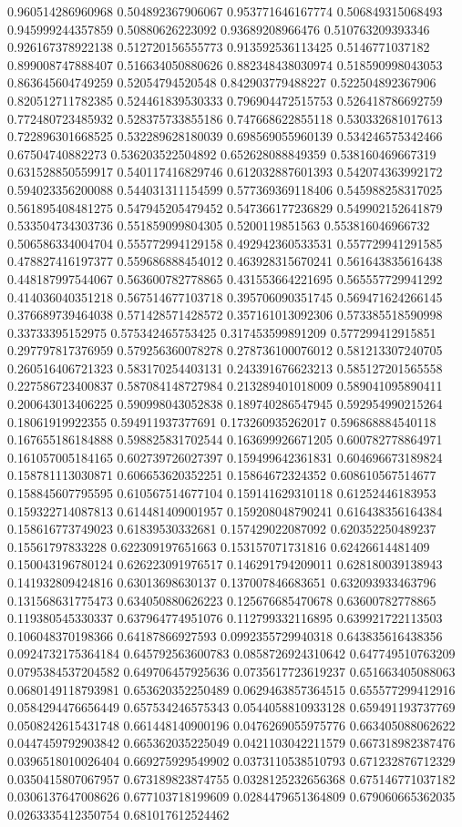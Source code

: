 \begin{table}
\begin{tabu}
\begin{sparkline}{10}
0.960514286960968 0.504892367906067 0.953771646167774 0.506849315068493 0.945999244357859 0.50880626223092 0.93689208966476 0.510763209393346 0.926167378922138 0.512720156555773 0.913592536113425 0.5146771037182 0.899008747888407 0.516634050880626 0.882348438030974 0.518590998043053 0.863645604749259 0.52054794520548 0.842903779488227 0.522504892367906 0.820512711782385 0.524461839530333 0.796904472515753 0.526418786692759 0.772480723485932 0.528375733855186 0.747668622855118 0.530332681017613 0.722896301668525 0.532289628180039 0.698569055960139 0.534246575342466 0.67504740882273 0.536203522504892 0.652628088849359 0.538160469667319 0.631528850559917 0.540117416829746 0.612032887601393 0.542074363992172 0.594023356200088 0.544031311154599 0.577369369118406 0.545988258317025 0.561895408481275 0.547945205479452 0.547366177236829 0.549902152641879 0.533504734303736 0.551859099804305 0.5200119851563 0.553816046966732 0.506586334004704 0.555772994129158 0.492942360533531 0.557729941291585 0.478827416197377 0.559686888454012 0.463928315670241 0.561643835616438 0.448187997544067 0.563600782778865 0.431553664221695 0.565557729941292 0.414036040351218 0.567514677103718 0.395706090351745 0.569471624266145 0.376689739464038 0.571428571428572 0.357161013092306 0.573385518590998 0.33733395152975 0.575342465753425 0.317453599891209 0.577299412915851 0.297797817376959 0.579256360078278 0.278736100076012 0.581213307240705 0.260516406721323 0.583170254403131 0.243391676623213 0.585127201565558 0.227586723400837 0.587084148727984 0.213289401018009 0.589041095890411 0.200643013406225 0.590998043052838 0.189740286547945 0.592954990215264 0.18061919922355 0.594911937377691 0.173260935262017 0.596868884540118 0.167655186184888 0.598825831702544 0.163699926671205 0.600782778864971 0.161057005184165 0.602739726027397 0.159499642361831 0.604696673189824 0.158781113030871 0.606653620352251 0.15864672324352 0.608610567514677 0.158845607795595 0.610567514677104 0.159141629310118 0.61252446183953 0.159322714087813 0.614481409001957 0.159208048790241 0.616438356164384 0.158616773749023 0.61839530332681 0.157429022087092 0.620352250489237 0.15561797833228 0.622309197651663 0.153157071731816 0.62426614481409 0.150043196780124 0.626223091976517 0.146291794209011 0.628180039138943 0.141932809424816 0.63013698630137 0.137007846683651 0.632093933463796 0.131568631775473 0.634050880626223 0.125676685470678 0.63600782778865 0.119380545330337 0.637964774951076 0.112799332116895 0.639921722113503 0.106048370198366 0.64187866927593 0.0992355729940318 0.643835616438356 0.0924732175364184 0.645792563600783 0.0858726924310642 0.647749510763209 0.0795384537204582 0.649706457925636 0.0735617723619237 0.651663405088063 0.0680149118793981 0.653620352250489 0.0629463857364515 0.655577299412916 0.0584294476656449 0.657534246575343 0.0544058810933128 0.659491193737769 0.0508242615431748 0.661448140900196 0.0476269055975776 0.663405088062622 0.0447459792903842 0.665362035225049 0.0421103042211579 0.667318982387476 0.0396518010026404 0.669275929549902 0.0373110538510793 0.671232876712329 0.0350415807067957 0.673189823874755 0.0328125232656368 0.675146771037182 0.0306137647008626 0.677103718199609 0.0284479651364809 0.679060665362035 0.0263335412350754 0.681017612524462 
\end{sparkline}
\end{tabu}
\end{table}
